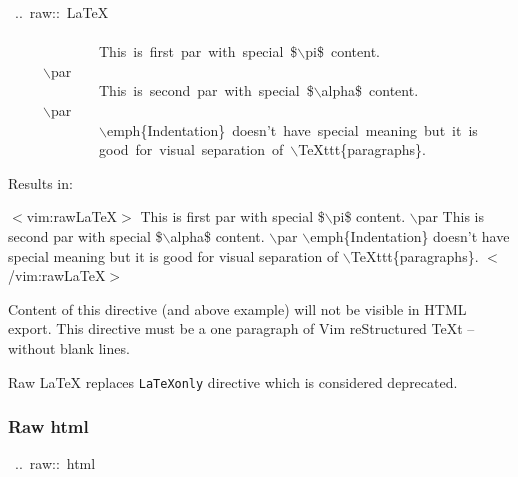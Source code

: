 \documentclass[12pt]{article}
\begin{document}
\begin{ttfamily}\begin{flushleft}
\mbox{~..~raw::~\LaTeX{}}\\
\mbox{}\\
\mbox{~~~~~~~~~~~~~This~is~first~par~with~special~\$$\backslash$pi\$~content.}\\
\mbox{~~~~~$\backslash$par}\\
\mbox{~~~~~~~~~~~~~This~is~second~par~with~special~\$$\backslash$alpha\$~content.}\\
\mbox{~~~~~$\backslash$par}\\
\mbox{~~~~~~~~~~~~~$\backslash$emph\{Indentation\}~doesn't~have~special~meaning~but~it~is}\\
\mbox{~~~~~~~~~~~~~good~for~visual~separation~of~$\backslash$\TeX{}ttt\{paragraphs\}.}\\
\end{flushleft}\end{ttfamily}

Results in:

$<$vim:raw\LaTeX{}$>$
 This is first par with special \$$\backslash$pi\$ content.
 $\backslash$par
 This is second par with special \$$\backslash$alpha\$ content.
 $\backslash$par
 $\backslash$emph\{Indentation\} doesn't have special meaning but it is
 good for visual separation of $\backslash$\TeX{}ttt\{paragraphs\}.
$<$/vim:raw\LaTeX{}$>$

Content of this directive (and above example) will not be visible in HTML
export. This directive must be a one paragraph of Vim reStructured \TeX{}t -- without blank lines.

Raw \LaTeX{} replaces \texttt{\LaTeX{}only} directive which is considered deprecated.

\hypertarget{lraw-html}{}
\subsubsection{Raw html}

\begin{ttfamily}\begin{flushleft}
\mbox{~..~raw::~html}\\
\end{flushleft}\end{ttfamily}
\end{document}
